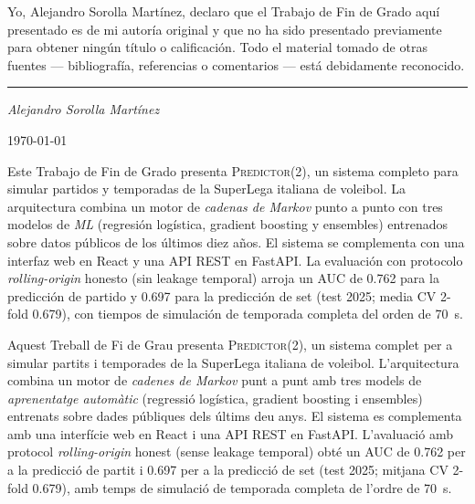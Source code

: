Yo, Alejandro Sorolla Mart\'inez, declaro que el Trabajo de Fin de Grado
aqu\'i presentado es de mi autor\'ia original y que no ha sido presentado
previamente para obtener ning\'un t\'itulo o calificaci\'on. Todo el material
tomado de otras fuentes --- bibliograf\'ia, referencias o comentarios ---
est\'a debidamente reconocido.

\vspace{2cm}
\noindent\rule{6cm}{0.4pt}

\noindent\textit{Alejandro Sorolla Mart\'inez}

\noindent\today

{%
Este Trabajo de Fin de Grado presenta \textsc{Predictor(2)}, un sistema
completo para simular partidos y temporadas de la SuperLega italiana de
voleibol. La arquitectura combina un motor de \emph{cadenas de Markov}
punto a punto con tres modelos de \emph{\ac{ML}} (regresi\'on
log\'istica, gradient boosting y ensembles) entrenados sobre datos p\'ublicos
de los \'ultimos diez a\~nos. El sistema se complementa con una interfaz
web en React y una API REST en FastAPI. La evaluaci\'on con protocolo
\emph{rolling-origin} honesto (sin leakage temporal) arroja un AUC de
\num{0.762} para la predicci\'on de partido y \num{0.697} para la
predicci\'on de set (test 2025; media CV 2-fold \num{0.679}), con tiempos de simulaci\'on de temporada completa del
orden de \qty{70}{\second}.
}

{%
Aquest Treball de Fi de Grau presenta \textsc{Predictor(2)}, un sistema
complet per a simular partits i temporades de la SuperLega italiana de
voleibol. L'arquitectura combina un motor de \emph{cadenes de Markov}
punt a punt amb tres models de \emph{aprenentatge autom\`atic} (regressi\'o
log\'istica, gradient boosting i ensembles) entrenats sobre dades p\'ubliques
dels \'ultims deu anys. El sistema es complementa amb una interfície
web en React i una API REST en FastAPI. L'avaluaci\'o amb protocol
\emph{rolling-origin} honest (sense leakage temporal) obt\'e un AUC de
\num{0.762} per a la predicci\'o de partit i \num{0.697} per a la
predicci\'o de set (test 2025; mitjana CV 2-fold \num{0.679}), amb temps de simulaci\'o de temporada completa de
l'ordre de \qty{70}{\second}.
}

